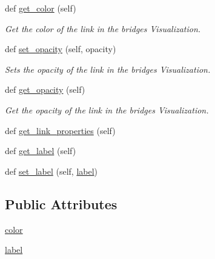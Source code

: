\begin{DoxyCompactItemize}
def \mbox{\hyperlink{classbridges_1_1link__visualizer_1_1_link_visualizer_aaff73e6c3c3fb6c4679ff7e43c2729fd}{get\+\_\+color}} (self)
\begin{DoxyCompactList}\small\item\em Get the color of the link in the bridges Visualization. \end{DoxyCompactList}\item 
def \mbox{\hyperlink{classbridges_1_1link__visualizer_1_1_link_visualizer_ae9c3b5a249a4d71d97d8bb3186a17e63}{set\+\_\+opacity}} (self, opacity)
\begin{DoxyCompactList}\small\item\em Sets the opacity of the link in the bridges Visualization. \end{DoxyCompactList}\item 
def \mbox{\hyperlink{classbridges_1_1link__visualizer_1_1_link_visualizer_a5bde29170a1a59b3e2f4d75dd9e13be9}{get\+\_\+opacity}} (self)
\begin{DoxyCompactList}\small\item\em Get the opacity of the link in the bridges Visualization. \end{DoxyCompactList}\item 
def \mbox{\hyperlink{classbridges_1_1link__visualizer_1_1_link_visualizer_a4115c919bee0422f4f22308cba0c5c99}{get\+\_\+link\+\_\+properties}} (self)
\item 
def \mbox{\hyperlink{classbridges_1_1link__visualizer_1_1_link_visualizer_a36268a1bc712fb42f4401846e70536e6}{get\+\_\+label}} (self)
\item 
def \mbox{\hyperlink{classbridges_1_1link__visualizer_1_1_link_visualizer_a51cb90a9162271fa083616321ae5faee}{set\+\_\+label}} (self, \mbox{\hyperlink{classbridges_1_1link__visualizer_1_1_link_visualizer_aace0e171fe2904f672b8ed3e0139343f}{label}})
\end{DoxyCompactItemize}
\subsection*{Public Attributes}
\begin{DoxyCompactItemize}
\item 
\mbox{\hyperlink{classbridges_1_1link__visualizer_1_1_link_visualizer_a253b0bdccb0a385f0ac0f14b97a18ed1}{color}}
\item 
\mbox{\hyperlink{classbridges_1_1link__visualizer_1_1_link_visualizer_aace0e171fe2904f672b8ed3e0139343f}{label}}
\end{DoxyCompactItemize}
